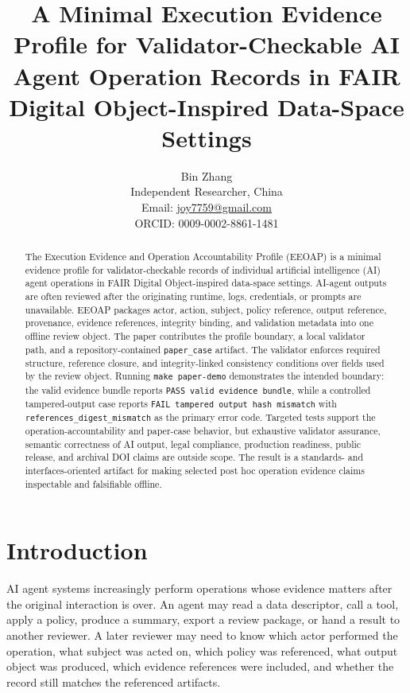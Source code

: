 \documentclass[11pt]{article}
\title{A Minimal Execution Evidence Profile for Validator-Checkable AI Agent Operation Records in FAIR Digital Object-Inspired Data-Space Settings}
\author{Bin Zhang\\
Independent Researcher, China\\
Email: \href{mailto:joy7759@gmail.com}{joy7759@gmail.com}\\
ORCID: 0009-0002-8861-1481}
\date{}
\begin{document}
\maketitle

\begin{abstract}
The Execution Evidence and Operation Accountability Profile (EEOAP) is a
minimal evidence profile for validator-checkable records of individual
artificial intelligence (AI) agent operations in FAIR Digital Object-inspired
data-space settings. AI-agent outputs are often reviewed after the originating
runtime, logs, credentials, or prompts are unavailable. EEOAP packages actor,
action, subject, policy reference, output reference, provenance, evidence
references, integrity binding, and validation metadata into one offline review
object. The paper contributes the profile boundary, a local validator path,
and a repository-contained \texttt{paper\_case} artifact. The validator
enforces required structure, reference closure, and integrity-linked
consistency conditions over fields used by the review object. Running
\texttt{make paper-demo} demonstrates the intended boundary: the valid
evidence bundle reports \texttt{PASS valid evidence bundle}, while a
controlled tampered-output case reports \texttt{FAIL tampered output hash
mismatch} with \texttt{references\_digest\_mismatch} as the primary error
code. Targeted tests support the operation-accountability and paper-case
behavior, but exhaustive validator assurance, semantic correctness of AI
output, legal compliance, production readiness, public release, and archival
DOI claims are outside scope. The result is a standards- and
interfaces-oriented artifact for making selected post hoc operation evidence
claims inspectable and falsifiable offline.
\end{abstract}

\section{Introduction}

AI agent systems increasingly perform operations whose evidence matters after
the original interaction is over. An agent may read a data descriptor, call a
tool, apply a policy, produce a summary, export a review package, or hand a
result to another reviewer. A later reviewer may need to know which actor
performed the operation, what subject was acted on, which policy was
referenced, what output object was produced, which evidence references were
included, and whether the record still matches the referenced artifacts.
\end{document}
